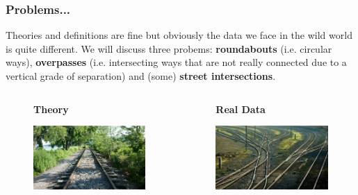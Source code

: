 \documentclass[c,10pt,pdftex]{beamer}
\begin{document}
\begin{frame}
  \frametitle{Problems...}
  \vspace{-0.5cm}
  Theories and definitions are fine but obviously the data we face in the wild world is quite different. We will discuss three probems: \textbf{roundabouts} (i.e. circular ways), \textbf{overpasses} (i.e. intersecting ways that are not really connected due to a vertical grade of separation) and (some) \textbf{street intersections}.  
  \begin{columns}
  	\begin{column}{0.5\linewidth}
  		\begin{figure}
  			\centering
  			\Large \textbf{Theory} \par \medskip
  			\includegraphics[width = \linewidth]{images/theory.png}
  		\end{figure}
  	\end{column}
  	\begin{column}{0.5\linewidth}
  		\begin{figure}
  			\centering
  			\Large \textbf{Real Data} \par \medskip
  			\includegraphics[width = \linewidth]{images/real_data.png}
  		\end{figure}
  	\end{column}
  \end{columns}
\end{frame}
\end{document}
